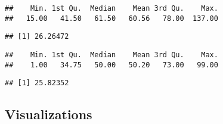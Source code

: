 \documentclass[
]{article}
\newenvironment{Shaded}{\begin{snugshade}}{\end{snugshade}}
\newcommand{\CommentTok}[1]{\textcolor[rgb]{0.56,0.35,0.01}{\textit{#1}}}
\newcommand{\FunctionTok}[1]{\textcolor[rgb]{0.13,0.29,0.53}{\textbf{#1}}}
\newcommand{\NormalTok}[1]{#1}
\newcommand{\SpecialCharTok}[1]{\textcolor[rgb]{0.81,0.36,0.00}{\textbf{#1}}}
\begin{document}
\begin{Shaded}
\end{Shaded}

\begin{verbatim}
##    Min. 1st Qu.  Median    Mean 3rd Qu.    Max. 
##   15.00   41.50   61.50   60.56   78.00  137.00
\end{verbatim}

\begin{Shaded}
\end{Shaded}

\begin{verbatim}
## [1] 26.26472
\end{verbatim}

\begin{Shaded}
\end{Shaded}

\begin{verbatim}
##    Min. 1st Qu.  Median    Mean 3rd Qu.    Max. 
##    1.00   34.75   50.00   50.20   73.00   99.00
\end{verbatim}

\begin{Shaded}
\end{Shaded}

\begin{verbatim}
## [1] 25.82352
\end{verbatim}

\subsection{Visualizations}\label{visualizations}
\end{document}
